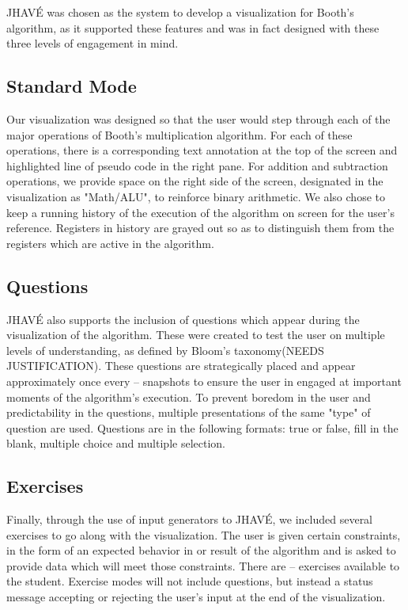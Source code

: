 \documentclass{acm_proc_article-sp}
\begin{document}
JHAVÉ was chosen as the system to develop a visualization for Booth's algorithm, as it supported these features and was in fact designed with these three levels of engagement in mind.\cite{JHAVE}

\subsection{Standard Mode}
Our visualization was designed so that the user would step through each of the major operations of Booth's multiplication algorithm.
For each of these operations, there is a corresponding text annotation at the top of the screen and highlighted line of pseudo code in the right pane.
For addition and subtraction operations, we provide space on the right side of the screen, designated in the visualization as "Math/ALU", to reinforce binary arithmetic.
We also chose to keep a running history of the execution of the algorithm on screen for the user's reference.
Registers in history are grayed out so as to distinguish them from the registers which are active in the algorithm.
\subsection{Questions}
JHAVÉ also supports the inclusion of questions which appear during the visualization of the algorithm.
These were created to test the user on multiple levels of understanding, as defined by Bloom's taxonomy(NEEDS JUSTIFICATION).
These questions are strategically placed and appear approximately once every -- snapshots to ensure the user in engaged at important moments of the algorithm's execution.
To prevent boredom in the user and predictability in the questions, multiple presentations of the same "type" of question are used.
Questions are in the following formats: true or false, fill in the blank, multiple choice and multiple selection.
\subsection{Exercises}%
Finally, through the use of input generators to JHAVÉ, we included several exercises to go along with the visualization.
The user is given certain constraints, in the form of an expected behavior in or result of the algorithm and is asked to provide data which will meet those constraints.
There are -- exercises available to the student.
Exercise modes will not include questions, but instead a status message accepting or rejecting the user's input at the end of the visualization.

\printbibliography

\balancecolumns
\end{document}
